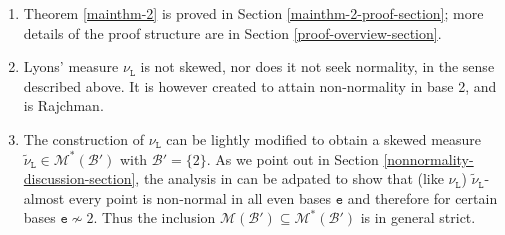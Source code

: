 \documentclass[12pt, twoside]{article}
\theoremstyle{definition}
\numberwithin{equation}{section}
\begin{document}
 \begin{enumerate}[1.]
\item Theorem \ref{mainthm-2} is proved in Section \ref{mainthm-2-proof-section}; more details of the proof structure are in Section \ref{proof-overview-section}. 
\item Lyons' measure $\nu_{\mathtt L}$ \cite{l86} is not skewed, nor does it not seek normality, in the sense described above. It is however created to attain non-normality in base 2, and is Rajchman. 
\item The construction of $\nu_{\mathtt L}$ can be lightly modified to obtain a skewed measure $\tilde{\nu}_{\mathtt L} \in \mathscr{M}^{\ast}(\mathscr{B}')$ with $\mathscr{B}' = \{2\}$. As we point out in Section \ref{nonnormality-discussion-section}, the analysis in \cite[Section 3.3]{PZ-1} can be adpated to show that (like $\nu_{\mathtt L}$) $\tilde{\nu}_{\mathtt L}$-almost every point is non-normal in all even bases $\mathtt e$ and therefore for certain bases $\mathtt e  \nsim 2$. Thus the inclusion $\mathscr{M}(\mathscr{B}') \subseteq \mathscr{M}^{\ast}(\mathscr{B}')$ is in general strict. 
\end{enumerate}  
\end{document}
